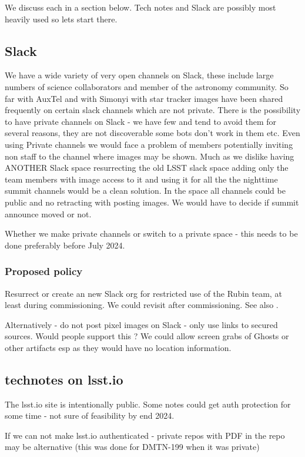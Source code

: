 We discuss each in a section below.
Tech notes and Slack are possibly most heavily used so lets start there.
\subsection{Slack}
We have a wide variety of very open channels on Slack, these include large numbers of science collaborators and member of the astronomy community.
So far with AuxTel and with Simonyi with star tracker images have been shared frequently on certain slack channels which are not private.
There is the possibility to have private channels on Slack - we have few and tend to avoid them for several reasons, they are not discoverable some bots don't work in them etc.
Even using Private channels we would face a problem of members potentially inviting non staff to the channel where images may be shown.
Much as we dislike having ANOTHER Slack space resurrecting the old LSST slack space adding only the team members with image access to it and using it for all the the nighttime summit channels would be a clean solution.
In the space all channels could be public and no retracting with posting images.
We would have to decide if summit announce moved or not.

Whether we make private channels or switch to a private space - this needs to be done preferably before July 2024.
\subsubsection{Proposed policy}
Resurrect or create an new Slack org for restricted use of the Rubin team, at least during commissioning.
We could revisit after commissioning.
See also .

Alternatively - do not post pixel images on Slack - only use links to secured sources.
Would people support this ? We could allow screen grabs of Ghosts or other artifacts esp as they would have no location information.

\subsection{technotes on lsst.io}
The lsst.io site is intentionally public.
Some notes could get auth protection for some time - not sure of feasibility by end 2024.

If we can not make lsst.io authenticated - private repos with PDF in the repo may be alternative (this was done for DMTN-199 when it was private)

